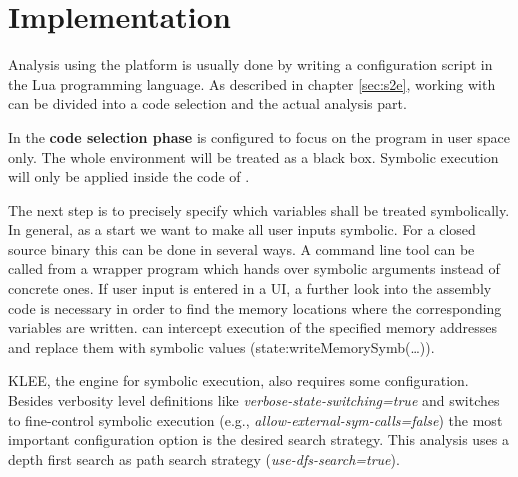 \section{Implementation}\label{sec:impl}

Analysis using the \sse platform is usually done by writing a configuration script in the Lua programming language.
As described in chapter \ref{sec:s2e}, working with \sse can be divided into a code selection and the actual analysis part.

\medskip
In the \textbf{code selection phase} \sse is configured to focus on the program \app in user space only.
The whole environment will be treated as a black box.
Symbolic execution will only be applied inside the code of \app.

The next step is to precisely specify which variables shall be treated symbolically.
In general, as a start we want to make all user inputs symbolic.
For a closed source binary this can be done in several ways.
A command line tool can be called from a wrapper program which hands over symbolic arguments instead of concrete ones.
If user input is entered in a UI, a further look into the assembly code is necessary in order to find the memory locations where the corresponding variables are written. 
\sse can intercept execution of the specified memory addresses and replace them with symbolic values (state:writeMemorySymb(\ldots)).

KLEE, the engine for symbolic execution, also requires some configuration.
Besides verbosity level definitions like \textit{verbose-state-switching=true} and switches to fine-control symbolic execution (e.g., \textit{allow-external-sym-calls=false}) the most important configuration option is the desired search strategy.
This analysis uses a depth first search as path search strategy (\textit{use-dfs-search=true}).

